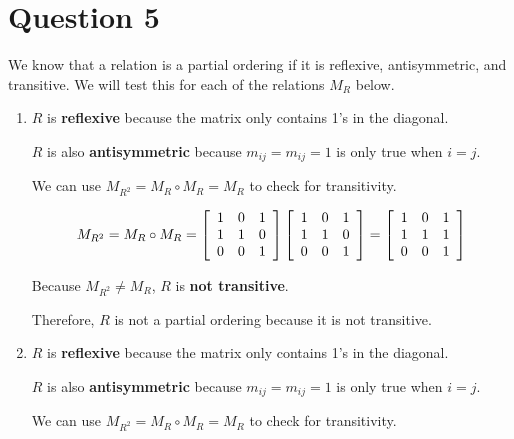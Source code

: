 \documentclass[letterpaper, 12pt]{article}
\begin{document}
\section*{Question 5}
We know that a relation is a partial ordering if it is reflexive, antisymmetric, and transitive. We will test this for each of the relations $M_R$ below.

\begin{enumerate}
    \item $R$ is \textbf{reflexive} because the matrix only contains 1's in the diagonal. 
    
    $R$ is also \textbf{antisymmetric} because $m_{ij} = m_{ij} = 1$ is only true when $i = j$.
    
    We can use $M_{R^2} = M_R \circ M_R = M_R$ to check for transitivity.
    
    \[
    M_{R^2} = M_R \circ M_R =
    \left[
    \begin{array}{c c c}
         1 & 0 & 1 \\
         1 & 1 & 0 \\
         0 & 0 & 1
    \end{array}
    \right]
    \left[
    \begin{array}{c c c}
         1 & 0 & 1 \\
         1 & 1 & 0 \\
         0 & 0 & 1
    \end{array}
    \right]
    =
    \left[
    \begin{array}{c c c}
         1 & 0 & 1 \\
         1 & 1 & 1 \\
         0 & 0 & 1
    \end{array}
    \right]
    \]
    
    Because $M_{R^2} \neq M_R$, $R$ is \textbf{not transitive}.
    
    Therefore, $R$ is not a partial ordering because it is not transitive.
    
    \item $R$ is \textbf{reflexive} because the matrix only contains 1's in the diagonal. 
    
    $R$ is also \textbf{antisymmetric} because $m_{ij} = m_{ij} = 1$ is only true when $i = j$.
    
    We can use $M_{R^2} = M_R \circ M_R = M_R$ to check for transitivity.
    

\end{enumerate}
\end{document}
